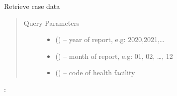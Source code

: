 \documentclass[letterpaper,10pt,english,openany,oneside]{sphinxmanual}
\begin{document}
\begin{fulllineitems}
\label{\detokenize{api/v4:post--api4-Reports-hc_data}}
\sphinxAtStartPar
Retrieve case data
\begin{quote}\begin{description}
\item[{Query Parameters}] \leavevmode\begin{itemize}
\item {} 
\sphinxAtStartPar
{} () – year of report, e.g: 2020,2021,…

\item {} 
\sphinxAtStartPar
{} () – month of report, e.g: 01, 02, …, 12

\item {} 
\sphinxAtStartPar
{} () – code of health facility

\end{itemize}

\end{description}\end{quote}

\sphinxAtStartPar
{}:


\end{fulllineitems}
\end{document}
